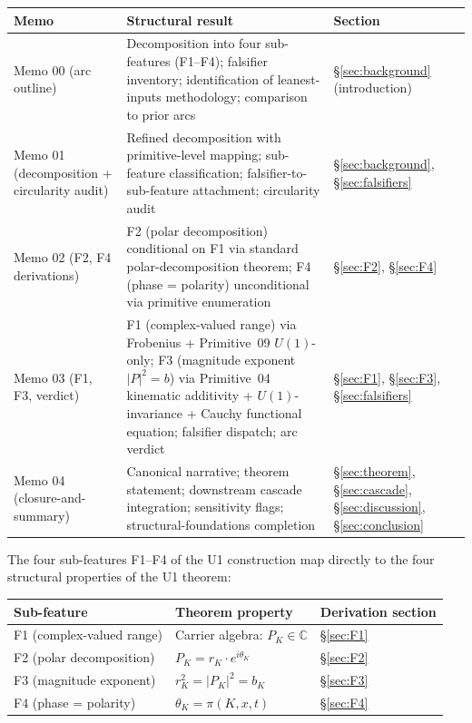 \documentclass[11pt,a4paper]{article}
\begin{document}
\begin{center}
\begin{tabular}{p{3.5cm}p{7.5cm}p{3.5cm}}
\hline
Memo & Structural result & Section \\
\hline
Memo 00 (arc outline) & Decomposition into four sub-features (F1--F4); falsifier inventory; identification of leanest-inputs methodology; comparison to prior arcs & \S\ref{sec:background} (introduction) \\
Memo 01 (decomposition + circularity audit) & Refined decomposition with primitive-level mapping; sub-feature classification; falsifier-to-sub-feature attachment; circularity audit & \S\ref{sec:background}, \S\ref{sec:falsifiers} \\
Memo 02 (F2, F4 derivations) & F2 (polar decomposition) conditional on F1 via standard polar-decomposition theorem; F4 (phase = polarity) unconditional via primitive enumeration & \S\ref{sec:F2}, \S\ref{sec:F4} \\
Memo 03 (F1, F3, verdict) & F1 (complex-valued range) via Frobenius + Primitive~09 $U(1)$-only; F3 (magnitude exponent $|P|^2 = b$) via Primitive~04 kinematic additivity + $U(1)$-invariance + Cauchy functional equation; falsifier dispatch; arc verdict & \S\ref{sec:F1}, \S\ref{sec:F3}, \S\ref{sec:falsifiers} \\
Memo 04 (closure-and-summary) & Canonical narrative; theorem statement; downstream cascade integration; sensitivity flags; structural-foundations completion & \S\ref{sec:theorem}, \S\ref{sec:cascade}, \S\ref{sec:discussion}, \S\ref{sec:conclusion} \\
\hline
\end{tabular}
\end{center}

The four sub-features F1--F4 of the U1 construction map directly to the four structural properties of the U1 theorem:

\begin{center}
\begin{tabular}{lll}
\hline
Sub-feature & Theorem property & Derivation section \\
\hline
F1 (complex-valued range) & Carrier algebra: $P_K \in \mathbb{C}$ & \S\ref{sec:F1} \\
F2 (polar decomposition) & $P_K = r_K \cdot e^{i \theta_K}$ & \S\ref{sec:F2} \\
F3 (magnitude exponent) & $r_K^2 = |P_K|^2 = b_K$ & \S\ref{sec:F3} \\
F4 (phase = polarity) & $\theta_K = \pi(K, x, t)$ & \S\ref{sec:F4} \\
\hline
\end{tabular}
\end{center}
\end{document}
